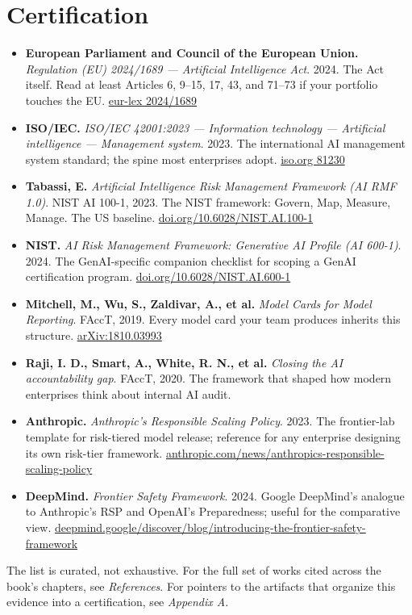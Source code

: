\section{Certification}

\begin{itemize}
\item \textbf{European Parliament and Council of the European Union.} \textit{Regulation (EU) 2024/1689 --- Artificial Intelligence Act}. 2024. The Act itself. Read at least Articles 6, 9--15, 17, 43, and 71--73 if your portfolio touches the EU. \href{https://eur-lex.europa.eu/eli/reg/2024/1689/oj}{eur-lex 2024/1689}

\item \textbf{ISO/IEC.} \textit{ISO/IEC 42001:2023 --- Information technology --- Artificial intelligence --- Management system}. 2023. The international AI management system standard; the spine most enterprises adopt. \href{https://www.iso.org/standard/81230.html}{iso.org 81230}

\item \textbf{Tabassi, E.} \textit{Artificial Intelligence Risk Management Framework (AI RMF 1.0)}. NIST AI 100-1, 2023. The NIST framework: Govern, Map, Measure, Manage. The US baseline. \href{https://doi.org/10.6028/NIST.AI.100-1}{doi.org/10.6028/NIST.AI.100-1}

\item \textbf{NIST.} \textit{AI Risk Management Framework: Generative AI Profile (AI 600-1)}. 2024. The GenAI-specific companion checklist for scoping a GenAI certification program. \href{https://doi.org/10.6028/NIST.AI.600-1}{doi.org/10.6028/NIST.AI.600-1}

\item \textbf{Mitchell, M., Wu, S., Zaldivar, A., et al.} \textit{Model Cards for Model Reporting}. FAccT, 2019. Every model card your team produces inherits this structure. \href{https://arxiv.org/abs/1810.03993}{arXiv:1810.03993}

\item \textbf{Raji, I. D., Smart, A., White, R. N., et al.} \textit{Closing the AI accountability gap}. FAccT, 2020. The framework that shaped how modern enterprises think about internal AI audit.

\item \textbf{Anthropic.} \textit{Anthropic's Responsible Scaling Policy}. 2023. The frontier-lab template for risk-tiered model release; reference for any enterprise designing its own risk-tier framework. \href{https://www.anthropic.com/news/anthropics-responsible-scaling-policy}{anthropic.com/news/anthropics-responsible-scaling-policy}

\item \textbf{DeepMind.} \textit{Frontier Safety Framework}. 2024. Google DeepMind's analogue to Anthropic's RSP and OpenAI's Preparedness; useful for the comparative view. \href{https://deepmind.google/discover/blog/introducing-the-frontier-safety-framework/}{deepmind.google/discover/blog/introducing-the-frontier-safety-framework}
\end{itemize}

\TNrule

The list is curated, not exhaustive. For the full set of works cited across the book's chapters, see \textit{References}. For pointers to the artifacts that organize this evidence into a certification, see \textit{Appendix A}.

\stoptwocol
